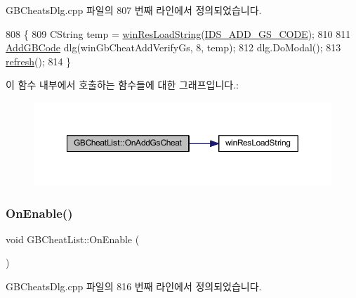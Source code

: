G\+B\+Cheats\+Dlg.\+cpp 파일의 807 번째 라인에서 정의되었습니다.


\begin{DoxyCode}
808 \{
809   CString temp = \mbox{\hyperlink{_win_res_util_8cpp_a416e85e80ab9b01376e87251c83d1a5a}{winResLoadString}}(\mbox{\hyperlink{resource_8h_a9ec2cbb3ce05e833475344dc0e70281d}{IDS\_ADD\_GS\_CODE}});
810 
811   \mbox{\hyperlink{class_add_g_b_code}{AddGBCode}} dlg(winGbCheatAddVerifyGs, 8, temp);
812   dlg.DoModal();
813   \mbox{\hyperlink{class_g_b_cheat_list_a248cc28fa5e392d2f55d0f66ff6c5821}{refresh}}();
814 \}
\end{DoxyCode}
이 함수 내부에서 호출하는 함수들에 대한 그래프입니다.\+:
\nopagebreak
\begin{figure}[H]
\begin{center}
\leavevmode
\includegraphics[width=350pt]{class_g_b_cheat_list_a50f8baaa9c1fc25bbddc698d1679b4c3_cgraph}
\end{center}
\end{figure}
\mbox{\label{class_g_b_cheat_list_a3a9af133cd9547881b6f71404ab9171f}} 
\subsubsection{\texorpdfstring{On\+Enable()}{OnEnable()}}
{\footnotesize\ttfamily void G\+B\+Cheat\+List\+::\+On\+Enable (\begin{DoxyParamCaption}{ }\end{DoxyParamCaption})\hspace{0.3cm}{\ttfamily [protected]}}



G\+B\+Cheats\+Dlg.\+cpp 파일의 816 번째 라인에서 정의되었습니다.


